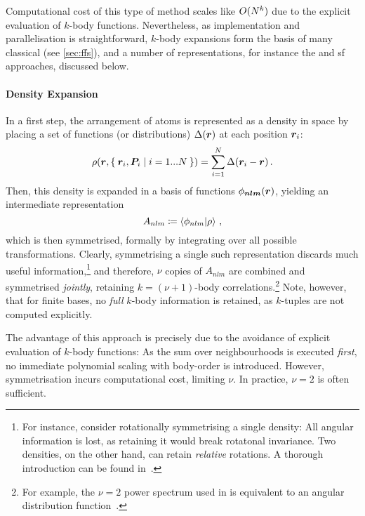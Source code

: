Computational cost of this type of method scales like $O(N^k)$ due to the explicit evaluation of $k$-body functions. Nevertheless, as implementation and parallelisation is straightforward, $k$-body expansions form the basis of many classical \ffs (see \cref{sec:ffs}), and a number of \ml representations, for instance the \mbtr and \gls{sf} approaches, discussed below.

\paragraph{Density Expansion} In a first step, the arrangement of atoms is represented as a density in space by placing a set of functions (or distributions) $\Delta(\boldsymbol{r})$ at each position $\boldsymbol{r}_i$:
\begin{equation}
	\rho(\boldsymbol{r}, \Set{\boldsymbol{r}_i, \boldsymbol{P}_i | i=1...N}) = \sum_{i=1}^N \Delta(\boldsymbol{r}_i-\boldsymbol{r}) \, .
\end{equation}
Then, this density is expanded in a basis of functions $\phi_{\boldsymbol{nlm}}(\boldsymbol{r})$, yielding an intermediate representation
\begin{equation}
	A_{nlm} \coloneqq \braket{\phi_{nlm} | \rho} \, ,
\end{equation}
which is then symmetrised, formally by integrating over all possible transformations. Clearly, symmetrising a single such representation discards much useful information,\footnote{For instance, consider rotationally symmetrising a single density: All angular information is lost, as retaining it would break rotatonal invariance. Two densities, on the other hand, can retain \emph{relative} rotations. A thorough introduction can be found in~\cite{mgcc2021q}.} and therefore, $\nu$ copies of $A_{nlm}$ are combined and symmetrised \emph{jointly}, retaining $k=(\nu+1)$-body correlations.\footnote{For example, the $\nu=2$ power spectrum used in \soap is equivalent to an angular distribution function~\cite{jkk2019q}.} Note, however, that for finite bases, no \emph{full} $k$-body information is retained, as $k$-tuples are not computed explicitly.

The advantage of this approach is precisely due to the avoidance of explicit evaluation of $k$-body functions: As the sum over neighbourhoods is executed \emph{first}, no immediate polynomial scaling with body-order is introduced. However, symmetrisation incurs computational cost, limiting $\nu$. In practice, $\nu=2$ is often sufficient.

